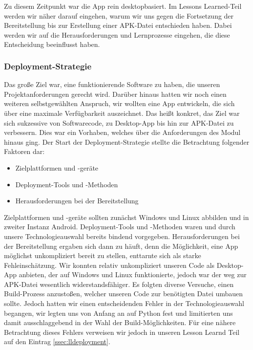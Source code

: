 		Zu diesem Zeitpunkt war die App rein desktopbasiert. Im Lessons Learned-Teil werden wir näher darauf eingehen, warum wir uns gegen die Fortsetzung der Bereitstellung bis zur Erstellung einer APK-Datei entschieden haben. Dabei werden wir auf die Herausforderungen und Lernprozesse eingehen, die diese Entscheidung beeinflusst haben.
		
	\subsubsection{Deployment-Strategie}
	\label{sssec:deployment}
		
		Das große Ziel war, eine funktionierende Software zu haben, die unseren Projektanforderungen gerecht wird. Darüber hinaus hatten wir noch einen weiteren selbstgewählten Anspruch, wir wollten eine App entwickeln, die sich über eine maximale Verfügbarkeit auszeichnet. Das heißt konkret, das Ziel war sich sukzessive von Softwarecode, zu Desktop-App bis hin zur APK-Datei zu verbessern. Dies war ein Vorhaben, welches über die Anforderungen des Modul hinaus ging. Der Start der Deployment-Strategie stellte die Betrachtung folgender Faktoren dar:
		
		\begin{itemize}
			\item Zielplattformen und -geräte
			\item Deployment-Tools und -Methoden
			\item Herausforderungen bei der Bereitstellung
		\end{itemize}
		
		\noindent Zielplattformen und -geräte sollten zunächst Windows und Linux abbilden und in zweiter Instanz Android. Deployment-Tools und -Methoden waren und durch unsere Technologieauswahl bereits bindend vorgegeben. Herausforderungen bei der Bereitstellung ergaben sich dann zu häuft, denn die Möglichkeit, eine App möglichst unkompliziert bereit zu stellen, enttarnte sich als starke Fehleinschätzung. Wir konnten relativ unkompliziert unseren Code als Desktop-App anbieten, der auf Windows und Linux funktionierte, jedoch war der weg zur APK-Datei wesentlich widerstandsfähiger. Es folgten diverse Versuche, einen Build-Prozess anzustoßen, welcher unseren Code zur benötigten Datei umbauen sollte. Jedoch hatten wir einen entscheidenden Fehler in der Technologieauswahl begangen, wir legten uns von Anfang an auf Python fest und limitierten uns damit ausschlaggebend in der Wahl der Build-Möglichkeiten. Für eine nähere Betrachtung dieses Fehlers verweisen wir jedoch in unseren Lesson Learnd Teil auf den Eintrag \ref{ssec:lldeployment}.
